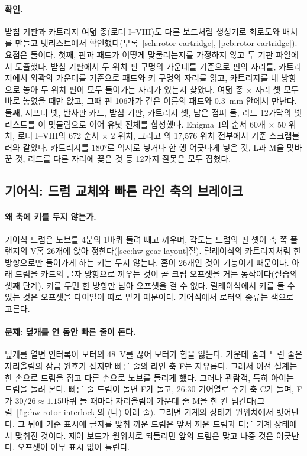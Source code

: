 \paragraph{확인.} 받침 기판과 카트리지 여덟 종(로터 I--VIII)도 다른 보드처럼 생성기로 회로도와 배치를 만들고
넷리스트에서 확인했다(부록~\ref{sch:rotor-cartridge}, \ref{pcb:rotor-cartridge}). 요점은 둘이다. 첫째, 핀과 패드가 어떻게
맞물리는지를 가정하지 않고 두 기판 파일에서 도출했다. 받침 기판에서 두 위치 핀 구멍의 가운데를 기준으로 핀의 자리를,
카트리지에서 외곽의 가운데를 기준으로 패드와 키 구멍의 자리를 읽고, 카트리지를 네 방향으로 놓아 두 위치 핀이 모두
들어가는 자리가 있는지 찾았다. 여덟 종 $\times$ 자리 셋 모두 바로 놓였을 때만 앉고, 그때 핀 106개가 같은 이름의
패드와 0.3~mm 안에서 만난다. 둘째, 시프터 넷, 반사판 카드, 받침 기판, 카트리지 셋, 남은 점퍼 둘, 리드 12가닥의
넷리스트를 이 맞물림으로 이어 유닛 전체를 합성했다. Enigma~I의 순서 60개 $\times$ 50 위치, 로터 I--VIII의 672 순서
$\times$ 2 위치, 그리고 의 17,576 위치 전부에서 기준 스크램블러와 같았다. 카트리지를 180°로 억지로
넣거나 한 행 어긋나게 넣은 것, L과 M을 맞바꾼 것, 리드를 다른 자리에 꽂은 것 등 12가지 잘못은 모두 잡혔다.

\subsection{기어식: 드럼 교체와 빠른 라인 축의 브레이크}

\paragraph{왜 축에 키를 두지 않는가.} 기어식 드럼은 노브를 4분의 1바퀴 돌려 빼고 끼우며, 각도는 드럼의 핀 셋이 축
쪽 플랜지의 V홈 26개에 앉아 정한다(\ref{sec:hw-gear-layout}절). 릴레이식의 카트리지처럼 한 방향으로만 들어가게 하는
키는 두지 않는다. 홈이 26개인 것이 기능이기 때문이다. 아래 드럼을 카드의 글자 방향으로 끼우는 것이 곧 크립
오프셋을 거는 동작이다(실습의 셋째 단계). 키를 두면 한 방향만 남아 오프셋을 걸 수 없다. 릴레이식에서 키를 둘 수
있는 것은 오프셋을 다이얼이 따로 맡기 때문이다. 기어식에서 로터의 종류는 색으로 고른다.

\paragraph{문제: 덮개를 연 동안 빠른 줄이 돈다.} 덮개를 열면 인터록이 모터의 48~V를 끊어 모터가 힘을 잃는다.
가운데 줄과 느린 줄은 자리올림의 잠금 원호가 잡지만 빠른 줄의 라인 축 F는 자유롭다. 그래서 이전 설계는 한 손으로
드럼을 잡고 다른 손으로 노브를 돌리게 했다. 그러나 관람객, 특히 아이는 드럼을 돌려 본다. 빠른 줄 드럼이 돌면 F가
돌고, 26:30 기어열로 주기 축 C가 돌며, F가 $30/26 \approx 1.15$바퀴 돌 때마다 자리올림이 가운데 줄 M을 한 칸
넘긴다(그림~\ref{fig:hw-rotor-interlock}의 (나) 아래 줄). 그러면 기계의 상태가 원위치에서 벗어난다. 그 뒤에 기준
표시에 글자를 맞춰 끼운 드럼은 앞서 끼운 드럼과 다른 기계 상태에서 맞춰진 것이다. 제어 보드가 원위치로 되돌리면
앞의 드럼은 맞고 나중 것은 어긋난다. 오프셋이 아무 표시 없이 틀린다.

